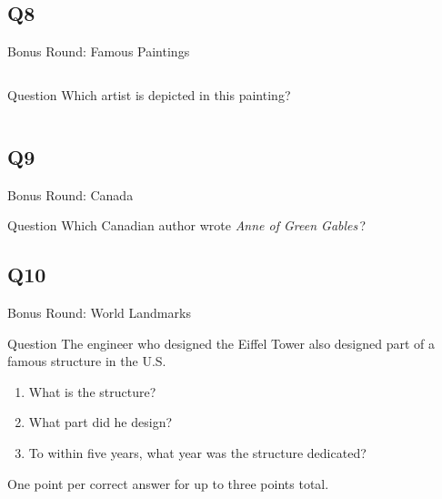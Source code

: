 \documentclass[11pt]{beamer}
\begin{document}
\subsection*{Q8}
\begin{frame}[t]{Bonus Round: Famous Paintings}
\vspace{0.5em}
\begin{columns}[T,totalwidth=\linewidth]
\begin{column}{0.25\linewidth}
\begin{block}{Question}
Which artist is depicted in this painting?
\end{block}
\end{column}
\begin{column}{0.7\linewidth}
\begin{center}
\texttt{[image: \{Images/michelangelo]}.jpg}
\end{center}
\end{column}
\end{columns}
\end{frame}
    

\subsection*{Q9}
\begin{frame}[t]{Bonus Round: Canada}
\vspace{0.5em}
\begin{block}{Question}
Which Canadian author wrote \emph{Anne of Green Gables}\,?
\end{block}
\end{frame}
    

\subsection*{Q10}
\begin{frame}[t]{Bonus Round: World Landmarks}
\vspace{0.5em}
\begin{block}{Question}
The engineer who designed the Eiffel Tower also designed part of a famous structure in the U.S. 
\begin{enumerate}
\item What is the structure?
\item What part did he design?
\item To within five years, what year was the structure dedicated?
\end{enumerate}
One point per correct answer for up to three points total.
\end{block}
\end{frame}
    
\end{document}
